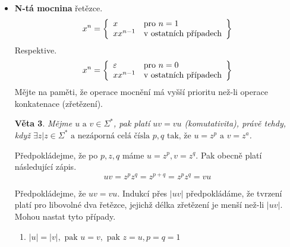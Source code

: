 \documentclass[10pt, a4paper, titlepage]{article}
\theoremstyle{note}
\newtheorem{veta}{\textbf{Věta}}
\begin{document}
\begin{itemize}
\begin{veta}
\begin{gather*}
xy = xz \: \Longrightarrow \: y = z \\
yx = zx \: \Longrightarrow \: y = z
\end{gather*}
Algebraicky je operace zapsána jako $\langle \Sigma^{*}, \cdot, \varepsilon \rangle$.
\end{veta}

\begin{veta}
Vyslovme předpoklad, že platí $xy = uv$. Pak platí právě jedno z těchto tvrzení.
\begin{gather*}
x = u, y = v \\
|x| > |u| \text{ a } \exists w| w \neq \varepsilon, \text{ tak že } x = uw \text{ a } v = wy \\
|x| < |u| \text{ a } \exists w| w \neq \varepsilon, \text{ tak že } u = xw \text{ a } y = wv
\end{gather*}
\end{veta}

\item
\textbf{N-tá mocnina} řetězce.
$$ x^{n} = \left\lbrace
\begin{array}{l l}
x & \text{pro } n=1 \\
xx^{n-1} & \text{v ostatních případech} \\
\end{array}
\right\rbrace
$$
Respektive.
$$ x^{n} = \left\lbrace
\begin{array}{l l}
\varepsilon & \text{pro } n=0 \\
xx^{n-1} & \text{v ostatních případech} \\
\end{array}
\right\rbrace
$$
Mějte na paměti, že operace mocnění má vyšší prioritu než-li operace konkatenace (zřetězení).

\begin{veta}
Mějme $ u \text{ a } v \in \Sigma^{*}$, pak platí $uv = vu$ (komutativita), právě
tehdy, když $\exists z| z \in \Sigma^{*} \text{ a nezáporná celá čísla } p, q \text{ tak, že } u = z^{p} \text{ a } v=z^{a}$.
\end{veta}

Předpokládejme, že po $p, z, q$ máme $u = z^{p}, v = z^{q}$. Pak obecně platí následující zápis.
$$
uv = z^{p}z^{q} = z^{p+q} = z^{p} z^{q} = vu
$$

Předpokládejme, že $uv = vu$. Indukcí přes $|uv|$ předpokládáme, že tvrzení platí pro libovolné dva řetězce, jejichž délka zřetězení je menší
než-li $|uv|$. Mohou nastat tyto případy.
\begin{enumerate}
\item
$|u| = |v|, \text{ pak } u = v, \text{ pak } z = u, p = q = 1$


\end{enumerate}
\end{itemize}
\end{document}
